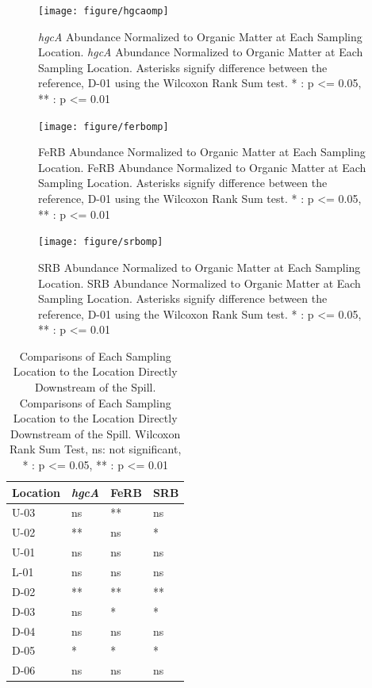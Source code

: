 \documentclass[ms, hidelinks]{uncgdissertationexp3}
\theoremstyle{plain}
\theoremstyle{definition}
\theoremstyle{remark}
\newcommand{\titlecaption}[2]{\caption[#1]{#1. #2}}
\begin{document}
\begin{figure}[htbp]
    \texttt{[image: figure/hgcaomp]}
    \titlecaption{\textit{hgcA} Abundance Normalized to Organic Matter at Each Sampling Location}{\textit{hgcA} Abundance Normalized to Organic Matter at Each Sampling Location. Asterisks signify difference between the reference, D-01 using the Wilcoxon Rank Sum test. * : p <= 0.05, ** : p <= 0.01}\label{fig:hgcaomp}
\end{figure}
\clearpage
\begin{figure}
  \texttt{[image: figure/ferbomp]}
   \titlecaption{FeRB Abundance Normalized to Organic Matter at Each Sampling Location}{FeRB Abundance Normalized to Organic Matter at Each Sampling Location. Asterisks signify difference between the reference, D-01 using the Wilcoxon Rank Sum test. * : p <= 0.05, ** : p <= 0.01}\label{fig:ferbomp}
\end{figure}
\clearpage
\begin{figure}
  \texttt{[image: figure/srbomp]}
   \titlecaption{SRB Abundance Normalized to Organic Matter at Each Sampling Location}{SRB Abundance Normalized to Organic Matter at Each Sampling Location. Asterisks signify difference between the reference, D-01 using the Wilcoxon Rank Sum test. * : p <= 0.05, ** : p <= 0.01}\label{fig:srbomp}
\end{figure}
\clearpage
\begin{table}[htbp]
  \centering
  \titlecaption{Comparisons of Each Sampling Location to the Location Directly Downstream of the Spill}{Comparisons of Each Sampling Location to the Location Directly Downstream of the Spill. Wilcoxon Rank Sum Test, ns: not significant, * : p <= 0.05, ** : p <= 0.01}\label{tab:compare}
    \begin{tabular}{llll}
  \toprule
  Location & \textit{hgcA} & FeRB & SRB\\
  \midrule
  U-03 & ns & ** & ns\\
  U-02 & ** & ns & *\\
  U-01 & ns & ns & ns\\
  L-01 & ns & ns & ns\\
  D-02 & ** & ** & **\\
  D-03 & ns & * & *\\
  D-04 & ns & ns & ns\\
  D-05 & * & * & *\\
  D-06 & ns & ns & ns\\
  \bottomrule
  \end{tabular}
  \vspace{-12pt}
\end{table}
\end{document}
